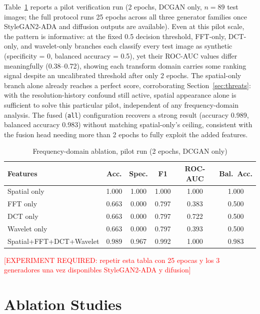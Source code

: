 \documentclass[journal]{IEEEtran}
\newcommand{\pending}[1]{\textcolor{red}{[EXPERIMENT REQUIRED: #1]}}
\begin{document}
Table~\ref{tab:freq_ablation} reports a pilot verification run (2 epochs, DCGAN only, $n=89$ test images; the full protocol runs 25 epochs across all three generator families once StyleGAN2-ADA and diffusion outputs are available). Even at this pilot scale, the pattern is informative: at the fixed 0.5 decision threshold, FFT-only, DCT-only, and wavelet-only branches each classify every test image as synthetic (specificity = 0, balanced accuracy = 0.5), yet their ROC-AUC values differ meaningfully (0.38--0.72), showing each transform domain carries some ranking signal despite an uncalibrated threshold after only 2 epochs. The spatial-only branch alone already reaches a perfect score, corroborating Section~\ref{sec:threats}: with the resolution-history confound still active, spatial appearance alone is sufficient to solve this particular pilot, independent of any frequency-domain analysis. The fused (\texttt{all}) configuration recovers a strong result (accuracy 0.989, balanced accuracy 0.983) without matching spatial-only's ceiling, consistent with the fusion head needing more than 2 epochs to fully exploit the added features.

\begin{table}[t]
\centering
\caption{Frequency-domain ablation, pilot run (2 epochs, DCGAN only)}
\label{tab:freq_ablation}
\begin{tabular}{lccccc}
\toprule
Features & Acc. & Spec. & F1 & ROC-AUC & Bal.\ Acc. \\
\midrule
Spatial only & 1.000 & 1.000 & 1.000 & 1.000 & 1.000 \\
FFT only & 0.663 & 0.000 & 0.797 & 0.383 & 0.500 \\
DCT only & 0.663 & 0.000 & 0.797 & 0.722 & 0.500 \\
Wavelet only & 0.663 & 0.000 & 0.797 & 0.393 & 0.500 \\
Spatial+FFT+DCT+Wavelet & 0.989 & 0.967 & 0.992 & 1.000 & 0.983 \\
\bottomrule
\end{tabular}
\end{table}

\pending{repetir esta tabla con 25 epocas y los 3 generadores una vez disponibles StyleGAN2-ADA y difusion}

\section{Ablation Studies}
\label{sec:ablation}
\end{document}
